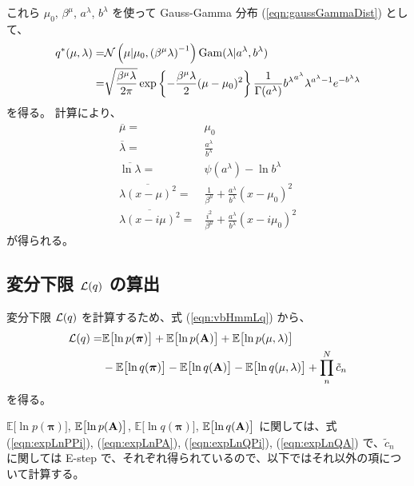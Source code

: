 これら $\mu_{0}$, $\beta^\mu$, $a^\lambda$, $b^\lambda$ を使って Gauss-Gamma 分布 (\ref{eqn:gaussGammaDist}) として、
\begin{align}
  q^*( \mu, \lambda )  =&  \mathcal{N}\left( \mu | \mu_{0}, \left(\beta^\mu {\lambda} \right)^{-1} \right) {\rm Gam}(\lambda | a^\lambda, b^\lambda) \\
  =&  \sqrt{ \frac{ \beta^\mu \lambda }{ 2 \pi }} \exp\left\{ - \frac{\beta^\mu \lambda}{2} (\mu - \mu_{0})^2 \right\} \frac{ 1 }{ \Gamma(a^\lambda) } {b^\lambda}^{a^\lambda} {\lambda}^{a^\lambda - 1} e^{-b^\lambda \lambda}
\end{align}
を得る。
計算により、
\begin{align}
  \overline{\mu}  =&  \mu_{0}  \\
  \overline{\lambda}  =&  \frac{a^\lambda}{b^\lambda}  \\
  \overline{\ln \lambda}  =&  \psi(a^\lambda) - \ln b^\lambda  \\
  \overline{\lambda (x - {\mu})^2}  =&  \frac{1}{\beta^\mu} + \frac{a^\lambda}{b^\lambda} (x - \mu_{0})^2  \\  
  \overline{\lambda (x - i {\mu})^2}  =&  \frac{i^2}{\beta^\mu} + \frac{a^\lambda}{b^\lambda} (x - i \mu_{0})^2  
\end{align}
が得られる。


\subsection{ 変分下限 ${\cal L}(q)$ の算出 }

変分下限 ${\cal L}(q)$ を計算するため、式 (\ref{eqn:vbHmmLq}) から、
\begin{align}
  {\cal L}(q)  = &  \mathbb{E}\bigl[\ln p({\boldsymbol \pi}) \bigr] + \mathbb{E}\bigl[\ln p({\bf A}) \bigr] + \mathbb{E}\bigl[\ln p(\mu, \lambda) \bigr]   \notag  \\
  &  - \mathbb{E}\bigl[\ln q({\boldsymbol \pi}) \bigr] - \mathbb{E}\bigl[\ln q({\bf A}) \bigr] - \mathbb{E}\bigl[\ln q( \mu, \lambda) \bigr] + \prod_n^N \tilde{c}_n  
\end{align}
を得る。

$\mathbb{E}\bigl[\ln p({\boldsymbol \pi})\bigr]$, $\mathbb{E}\bigl[\ln p({\bf A})\bigr]$, $\mathbb{E}\bigl[\ln q({\boldsymbol \pi})\bigr]$, $\mathbb{E}\bigl[\ln q({\bf A}) \bigr]$ に関しては、式 (\ref{eqn:expLnPPi}), (\ref{eqn:expLnPA}), (\ref{eqn:expLnQPi}), (\ref{eqn:expLnQA}) で、$\tilde{c}_n$ に関しては E-step で、それぞれ得られているので、以下ではそれ以外の項について計算する。

